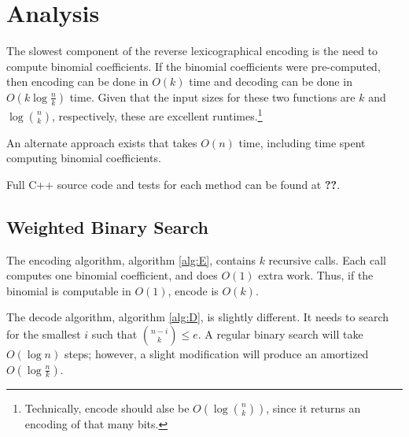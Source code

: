 \documentclass[preprint]{sigplanconf}
\begin{document}
	
	\section{Analysis}
	
	The slowest component of the reverse lexicographical encoding is the need to compute binomial coefficients.
	If the binomial coefficients were pre-computed, then encoding can be done in $O(k)$ time and decoding can be done in $O(k\log\frac{n}{k})$ time.
	Given that the input sizes for these two functions are $k$ and $\log\binom{n}{k}$, respectively, these are excellent runtimes.\footnote{
		Technically, encode should alse be $O(\log\binom{n}{k})$, since it returns an encoding of that many bits.}
	
	An alternate approach exists that takes $O(n)$ time, including time spent computing binomial coefficients.
	
	
	
	Full C++ source code and tests for each method can be found at \textbf{??}.
	
	
	\subsection{Weighted Binary Search}
	
	The encoding algorithm, algorithm \ref{alg:E}, contains $k$ recursive calls.
	Each call computes one binomial coefficient, and does $O(1)$ extra work.
	Thus, if the binomial is computable in $O(1)$, encode is $O(k)$.
	
	The decode algorithm, algorithm \ref{alg:D}, is slightly different.
	It needs to search for the smallest $i$ such that $\binom{n-i}{k} \le e$.
	A regular binary search will take $O(\log n)$ steps; however, a slight modification will produce an amortized $O(\log\frac{n}{k})$.

%	
%	
	
\end{document}
